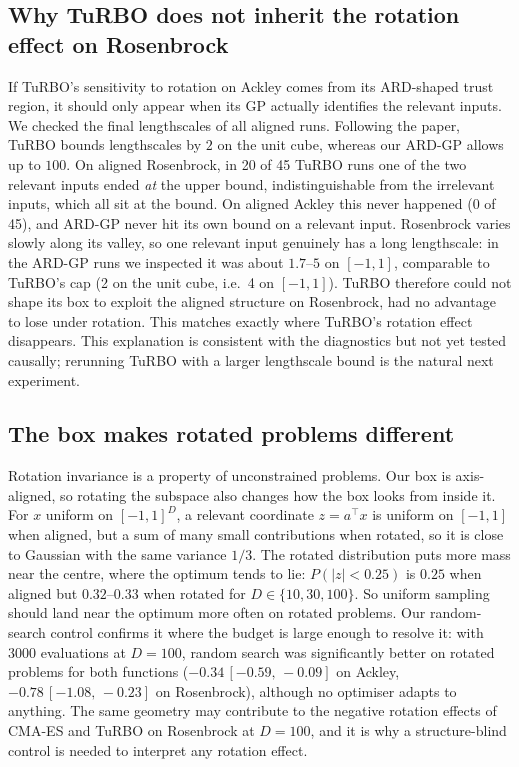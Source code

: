 \documentclass[12pt]{article}
\newcommand{\ci}[2]{\,[#1,\,#2]}
\begin{document}
\subsection{Why TuRBO does not inherit the rotation effect on Rosenbrock}\label{sec:turbo}
If TuRBO's sensitivity to rotation on Ackley comes from its ARD-shaped trust region, it should only
appear when its GP actually identifies the relevant inputs. We checked the final lengthscales of all aligned
runs. Following the paper, TuRBO bounds lengthscales by $2$ on the unit cube, whereas our ARD-GP allows
up to $100$. On aligned Rosenbrock, in 20 of 45 TuRBO runs one of the two relevant inputs ended
\emph{at} the upper bound, indistinguishable from the irrelevant inputs, which all sit at the bound.
On aligned Ackley this never happened (0 of 45), and ARD-GP never hit its own bound on a relevant
input. Rosenbrock varies slowly along its valley, so one relevant input genuinely has a long
lengthscale: in the ARD-GP runs we inspected it was about $1.7$--$5$ on $[-1,1]$, comparable to
TuRBO's cap (2 on the unit cube, i.e.\ 4 on $[-1,1]$). TuRBO
therefore could not shape its box to exploit the aligned structure on Rosenbrock, had no advantage to
lose under rotation. This matches exactly where TuRBO's rotation effect disappears. This explanation is consistent with the
diagnostics but not yet tested causally; rerunning TuRBO with a larger lengthscale bound is the
natural next experiment.

\subsection{The box makes rotated problems different}\label{sec:box}
Rotation invariance is a property of unconstrained problems. Our box is axis-aligned, so rotating
the subspace also changes how the box looks from inside it. For $x$ uniform on $[-1,1]^D$, a relevant
coordinate $z=a^\top x$ is uniform on $[-1,1]$ when aligned, but a sum of many small contributions
when rotated, so it is close to Gaussian with the same variance $1/3$. The rotated distribution puts
more mass near the centre, where the optimum tends to lie: $P(|z|<0.25)$ is $0.25$ when aligned
but $0.32$--$0.33$ when rotated for $D\in\{10,30,100\}$. So uniform sampling should land near
the optimum more often on rotated problems. Our random-search control confirms it where the budget is
large enough to resolve it: with 3000 evaluations at $D=100$, random search was significantly better on
rotated problems for both functions ($-0.34\ci{-0.59}{-0.09}$ on Ackley, $-0.78\ci{-1.08}{-0.23}$ on
Rosenbrock), although no optimiser adapts to anything. The same geometry may contribute to the
negative rotation effects of CMA-ES and TuRBO on Rosenbrock at $D=100$, and it is why a structure-blind
control is needed to interpret any rotation effect.
\end{document}
